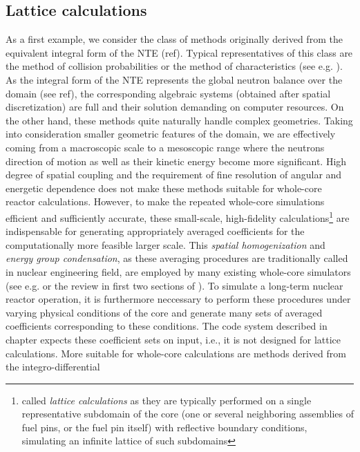 \subsection{Lattice calculations} \label{sec:lattice}
As a first example, we consider the class of
methods originally derived from the equivalent integral form of the NTE (\alert{ref}). Typical representatives of this
class are the method of collision probabilities or the method of characteristics (see e.g.
\cite{Cho2,Wu1,Hursin1,Petkov1,Sanchez1}). As the integral form of the NTE represents the global neutron balance over
the domain (see \alert{ref}), the corresponding algebraic systems (obtained after spatial discretization) are full and
their solution demanding on computer resources. On the other hand, these methods quite naturally handle complex
geometries. Taking into consideration smaller geometric features of the domain, we are effectively coming from a
macroscopic scale to a mesoscopic range where the neutrons direction of motion as well as their kinetic energy become
more significant. High degree of spatial coupling and the requirement of fine resolution of angular and energetic
dependence does not make these methods suitable for whole-core reactor calculations.
However, to make the repeated whole-core simulations efficient and sufficiently accurate, these small-scale,
high-fidelity calculations\footnote{called \textit{lattice calculations} as they are typically performed on a single
representative subdomain of the core (one or several neighboring assemblies of fuel pins, or the fuel pin itself)
with reflective boundary conditions, simulating an infinite lattice of such subdomains} are indispensable for
generating appropriately averaged coefficients for the computationally more feasible larger scale.
This \textit{spatial homogenization} and \textit{energy group condensation}, as these averaging procedures are
traditionally called in nuclear engineering field, are employed by many existing whole-core simulators (see e.g.
\cite[Chap. 17]{Reuss1} or the review in first two sections of \cite{Sanchez7}). To simulate a long-term nuclear reactor
operation, it is furthermore neccessary to perform these procedures under varying physical conditions of the core and
generate many sets of averaged coefficients corresponding to these conditions. The code system described in
\alert{chapter} expects these coefficient sets on input, i.e., it is not designed for lattice calculations.
\vspace*{1em}
More suitable for whole-core calculations are methods derived from the integro-differential
